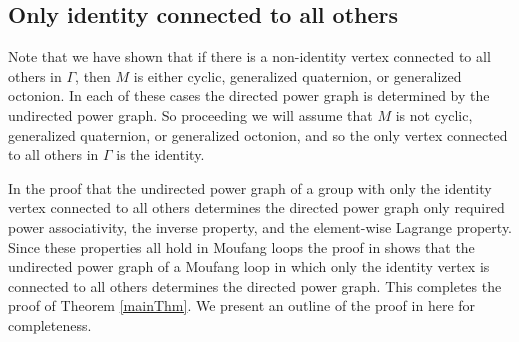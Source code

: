 \documentclass[12pt]{report}
\theoremstyle{definition}
\begin{document}
\subsection{Only identity connected to all others}

  Note that we have shown that if there is a non-identity vertex connected to all others in $\Gamma$,
    then $M$ is either cyclic, generalized quaternion, or generalized octonion. In each of these
    cases the directed power graph is determined by the undirected power graph. So proceeding we will
    assume that $M$ is not cyclic, generalized quaternion, or generalized octonion, and so the only
    vertex connected to all others in $\Gamma$ is the identity.

  In \cite{PGII} the proof that the undirected power graph of a group with only the identity vertex
    connected to all others determines the directed power graph only required power associativity,
    the inverse property, and the element-wise Lagrange property. Since these properties all hold in
    Moufang loops the proof in \cite{PGII} shows that the undirected power graph of a Moufang loop in
    which only the identity vertex is connected to all others determines the directed power graph.
    This completes the proof of Theorem \ref{mainThm}. We present an outline of the proof in
    \cite{PGII} here for completeness.
\end{document}
